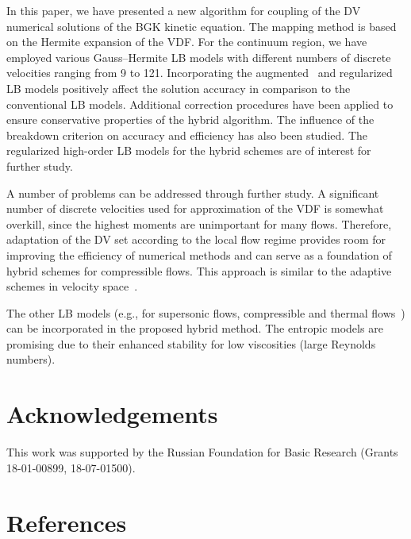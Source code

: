 \documentclass{elsarticle} %
\begin{document}
In this paper, we have presented a new algorithm for coupling of the DV numerical solutions of the BGK kinetic equation.
The mapping method is based on the Hermite expansion of the VDF.
For the continuum region, we have employed various Gauss--Hermite LB models with different numbers of discrete velocities ranging from 9 to 121.
Incorporating the augmented~\cite{Feuchter2016} and regularized~\cite{Latt2006, Mont2015} LB models
positively affect the solution accuracy in comparison to the conventional LB models.
Additional correction procedures have been applied to ensure conservative properties of the hybrid algorithm.
The influence of the breakdown criterion on accuracy and efficiency has also been studied.
The regularized high-order LB models for the hybrid schemes are of interest for further study.

A number of problems can be addressed through further study.
A significant number of discrete velocities used for approximation of the VDF is somewhat overkill,
since the highest moments are unimportant for many flows.
Therefore, adaptation of the DV set according to the local flow regime provides room for improving the efficiency of numerical methods
and can serve as a foundation of hybrid schemes for compressible flows.
This approach is similar to the adaptive schemes in velocity space~\cite{Aristov1977, Kolobov2013, Baranger2014}.

The other LB models (e.g., for supersonic flows, compressible and thermal flows~\cite{Chen2010, Frapolli2015, Frapolli2016})
can be incorporated in the proposed hybrid method.
The entropic models are promising due to their enhanced stability for low viscosities (large Reynolds numbers).

\section*{Acknowledgements}

This work was supported by the Russian Foundation for Basic Research (Grants 18-01-00899, 18-07-01500).

\section*{References}


\end{document}
